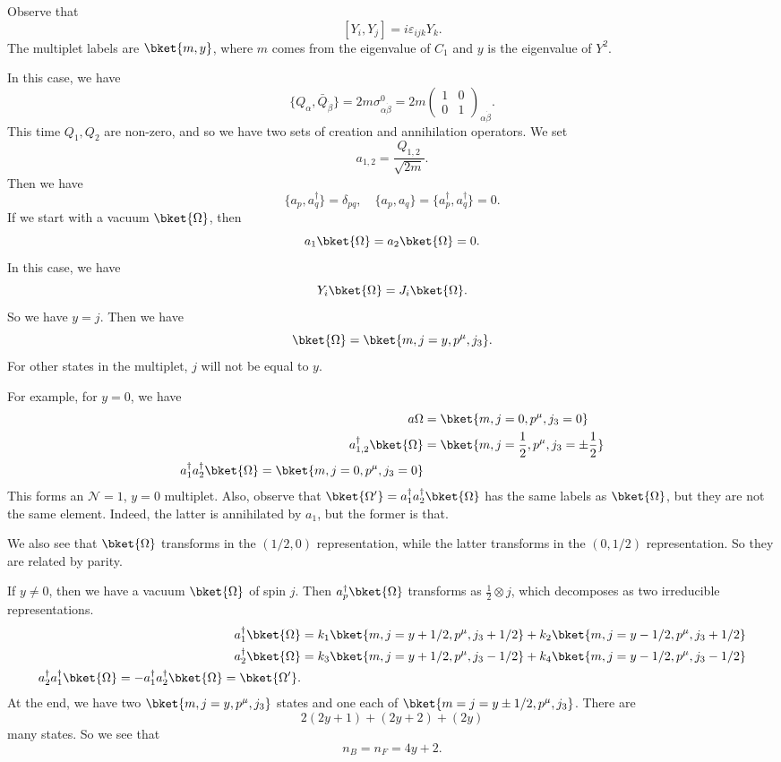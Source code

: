 \documentclass[a4paper]{article}
\begin{document}
Observe that
\[
  [Y_i, Y_j] = i \varepsilon_{ijk} Y_k.
\]
The multiplet labels are $\bket{m, y}$, where $m$ comes from the eigenvalue of $C_1$ and $y$ is the eigenvalue of $Y^2$.

In this case, we have
\[
  \{Q_\alpha, \bar{Q}_{\dot{\beta}}\} = 2m \sigma^0_{\alpha \dot{\beta}} = 2m
  \begin{pmatrix}
    1 & 0\\
    0 & 1
  \end{pmatrix}_{\alpha \dot{\beta}}.
\]
This time $Q_1, Q_2$ are non-zero, and so we have two sets of creation and annihilation operators. We set
\[
  a_{1, 2} = \frac{Q_{1, 2}}{\sqrt{2m}}.
\]
Then we have
\[
  \{a_p, a_q^\dagger\} = \delta_{pq},\quad \{a_p, a_q\} = \{a_p^\dagger, a_q^\dagger\} = 0.
\]
If we start with a vacuum $\bket{\Omega}$, then
\[
  a_1 \bket{\Omega} = a_2 \bket{\Omega} = 0.
\]
In this case, we have
\[
  Y_i \bket{\Omega} = J_i \bket{\Omega}.
\]
So we have $y = j$. Then we have
\[
  \bket{\Omega} = \bket{m, j = y, p^\mu ,j_3}.
\]
For other states in the multiplet, $j$ will not be equal to $y$.

For example, for $y = 0$, we have
\begin{align*}a
  \Omega &= \bket{m, j = 0, p^\mu, j_3 = 0}\\
  a^\dagger_{1, 2} \bket{\Omega} &= \bket{m, j = \frac{1}{2}, p^\mu, j_3 = \pm \frac{1}{2}}\\
  a_1^\dagger a_2^\dagger \bket{\Omega} = \bket{m, j = 0, p^\mu, j_3 = 0}
\end{align*}
This forms an $\mathcal{N} = 1$, $y = 0$ multiplet. Also, observe that $\bket{\Omega'} = a_1^\dagger a_2^\dagger \bket{\Omega}$ has the same labels as $\bket{\Omega}$, but they are not the same element. Indeed, the latter is annihilated by $a_1$, but the former is that.

We also see that $\bket{\Omega}$ transforms in the $(1/2, 0)$ representation, while the latter transforms in the $(0, 1/2)$ representation. So they are related by parity. %

If $y \not= 0$, then we have a vacuum $\bket{\Omega}$ of spin $j$. Then $a_p^\dagger \bket{\Omega}$ transforms as $\frac{1}{2} \otimes j$, which decomposes as two irreducible representations.
\begin{align*}
  a_1^\dagger \bket{\Omega} &= k_1 \bket{m, j = y + 1/2, p^\mu, j_3 + 1/2} + k_2 \bket{m, j= y - 1/2, p^\mu, j_3 + 1/2}\\
  a_2^\dagger \bket{\Omega} &= k_3 \bket{m, j = y + 1/2, p^\mu, j_3 - 1/2} + k_4 \bket{m, j = y-1/2, p^\mu, j_3 - 1/2}\\
  a_2^\dagger a_1^\dagger \bket{\Omega} = - a_1^\dagger a_2^\dagger \bket{\Omega} = \bket{\Omega'}.
\end{align*}
At the end, we have two $\bket{m, j = y, p^\mu, j_3}$ states and one each of $\bket{m = j = y \pm 1/2, p^\mu, j_3}$. There are
\[
  2(2y + 1) + (2y + 2) + (2y)
\]
many states. So we see that
\[
  n_B = n_F = 4y + 2.
\]
\end{document}
